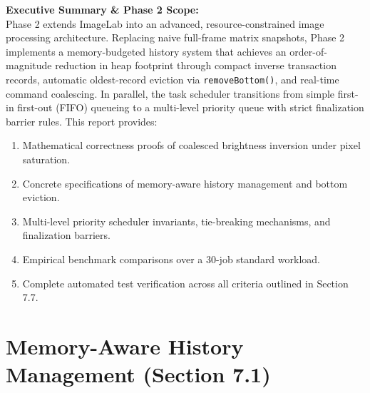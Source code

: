 \documentclass[10pt,a4paper]{article}
\begin{document}
\vspace{1.5cm}
\noindent \textbf{Executive Summary \& Phase 2 Scope:}\\
Phase 2 extends ImageLab into an advanced, resource-constrained image processing architecture. Replacing naive full-frame matrix snapshots, Phase 2 implements a memory-budgeted history system that achieves an order-of-magnitude reduction in heap footprint through compact inverse transaction records, automatic oldest-record eviction via \texttt{removeBottom()}, and real-time command coalescing. In parallel, the task scheduler transitions from simple first-in first-out (FIFO) queueing to a multi-level priority queue with strict finalization barrier rules. This report provides:
\begin{enumerate}
    \item Mathematical correctness proofs of coalesced brightness inversion under pixel saturation.
    \item Concrete specifications of memory-aware history management and bottom eviction.
    \item Multi-level priority scheduler invariants, tie-breaking mechanisms, and finalization barriers.
    \item Empirical benchmark comparisons over a 30-job standard workload.
    \item Complete automated test verification across all criteria outlined in Section 7.7.
\end{enumerate}

\clearpage

\section{Memory-Aware History Management (Section 7.1)}
\end{document}
